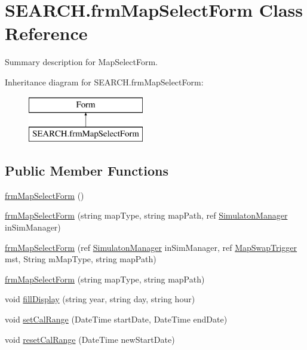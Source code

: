 \hypertarget{class_s_e_a_r_c_h_1_1frm_map_select_form}{\section{S\-E\-A\-R\-C\-H.\-frm\-Map\-Select\-Form Class Reference}
\label{class_s_e_a_r_c_h_1_1frm_map_select_form}
}


Summary description for Map\-Select\-Form.  


Inheritance diagram for S\-E\-A\-R\-C\-H.\-frm\-Map\-Select\-Form\-:\begin{figure}[H]
\begin{center}
\leavevmode
\includegraphics[height=2.000000cm]{class_s_e_a_r_c_h_1_1frm_map_select_form}
\end{center}
\end{figure}
\subsection*{Public Member Functions}
\begin{DoxyCompactItemize}
\item 
\hyperlink{class_s_e_a_r_c_h_1_1frm_map_select_form_a52539ec9e86aa288afbdbb9b3df116af}{frm\-Map\-Select\-Form} ()
\item 
\hyperlink{class_s_e_a_r_c_h_1_1frm_map_select_form_ae06ca96d108e91b4c9c9eed860e26a87}{frm\-Map\-Select\-Form} (string map\-Type, string map\-Path, ref \hyperlink{class_s_e_a_r_c_h_1_1_simulaton_manager}{Simulaton\-Manager} in\-Sim\-Manager)
\item 
\hyperlink{class_s_e_a_r_c_h_1_1frm_map_select_form_a7ff0313a16b3704222aa8c84badcf558}{frm\-Map\-Select\-Form} (ref \hyperlink{class_s_e_a_r_c_h_1_1_simulaton_manager}{Simulaton\-Manager} in\-Sim\-Manager, ref \hyperlink{class_s_e_a_r_c_h_1_1_map_swap_trigger}{Map\-Swap\-Trigger} mst, String m\-Map\-Type, string map\-Path)
\item 
\hyperlink{class_s_e_a_r_c_h_1_1frm_map_select_form_a8710b9cd210fdc9f599ef639d1e58dd0}{frm\-Map\-Select\-Form} (string map\-Type, string map\-Path)
\item 
void \hyperlink{class_s_e_a_r_c_h_1_1frm_map_select_form_a0214c48fd59d029aac1a3bd517d911b4}{fill\-Display} (string year, string day, string hour)
\item 
void \hyperlink{class_s_e_a_r_c_h_1_1frm_map_select_form_a336cd379724bbd241672b0752d21bec2}{set\-Cal\-Range} (Date\-Time start\-Date, Date\-Time end\-Date)
\item 
void \hyperlink{class_s_e_a_r_c_h_1_1frm_map_select_form_a41b0410bd11373d32b718bc44005be5e}{reset\-Cal\-Range} (Date\-Time new\-Start\-Date)
\end{DoxyCompactItemize}

